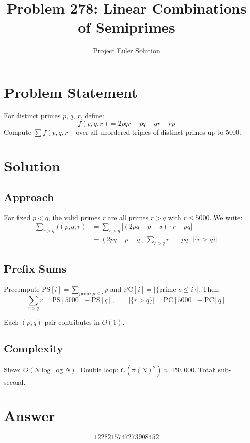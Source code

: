 \documentclass[12pt]{article}
\title{Problem 278: Linear Combinations of Semiprimes}
\author{Project Euler Solution}
\date{}
\begin{document}
\maketitle

\section{Problem Statement}
For distinct primes $p$, $q$, $r$, define:
\[
f(p,q,r) = 2pqr - pq - qr - rp
\]
Compute $\displaystyle\sum f(p,q,r)$ over all unordered triples of distinct primes up to 5000.

\section{Solution}

\subsection{Approach}
For fixed $p < q$, the valid primes $r$ are all primes $r > q$ with $r \le 5000$. We write:
\begin{align}
\sum_{r > q} f(p,q,r) &= \sum_{r > q} \bigl[(2pq - p - q) \cdot r - pq\bigr] \\
&= (2pq - p - q)\sum_{r > q} r \;-\; pq \cdot |\{r > q\}|
\end{align}

\subsection{Prefix Sums}
Precompute $\mathrm{PS}[i] = \sum_{\text{prime } p \le i} p$ and $\mathrm{PC}[i] = |\{\text{prime } p \le i\}|$. Then:
\[
\sum_{r > q} r = \mathrm{PS}[5000] - \mathrm{PS}[q], \qquad |\{r > q\}| = \mathrm{PC}[5000] - \mathrm{PC}[q]
\]

Each $(p,q)$ pair contributes in $O(1)$.

\subsection{Complexity}
Sieve: $O(N \log\log N)$. Double loop: $O(\pi(N)^2) \approx 450{,}000$. Total: sub-second.

\section{Answer}

\[
\boxed{1228215747273908452}
\]
\end{document}
